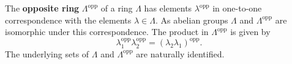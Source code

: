 The \textbf{opposite ring} $\Lambda^{\mathrm{opp}}$ of a ring $\Lambda$ has elements $\lambda^{\mathrm{opp}}$ in one-to-one correspondence with the elements $\lambda \in \Lambda$. As abelian groups $\Lambda$ and $\Lambda^{\mathrm{opp}}$ are isomorphic under this correspondence. The product in $\Lambda^{\mathrm{opp}}$ is given by
$$\lambda_1^{\mathrm{opp}} \lambda_2^{\mathrm{opp}} = (\lambda_2 \lambda_1)^{\mathrm{opp}}.$$
The underlying sets of $\Lambda$ and $\Lambda^{\mathrm{opp}}$ are naturally identified.
